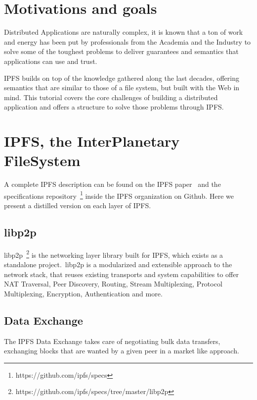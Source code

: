 \documentclass[runningheads,a4paper]{llncs}
\begin{document}

\section{Motivations and goals}\label{sec:motivation}

Distributed Applications are naturally complex, it is known that a ton of work and energy has been put by professionals from the Academia and the Industry to solve some of the toughest problems to deliver guarantees and semantics that applications can use and trust.

IPFS builds on top of the knowledge gathered along the last decades, offering semantics that are similar to those of a file system, but built with the Web in mind. This tutorial covers the core challenges of building a distributed application and offers a structure to solve those problems through IPFS\@.


\section{IPFS, the InterPlanetary FileSystem}\label{sec:ipfs}

A complete IPFS description can be found on the IPFS paper~\cite{IPFS} and the specifications repository~\footnote{https://github.com/ipfs/specs} inside the IPFS organization on Github. Here we present a distilled version on each layer of IPFS\@.

\subsection{libp2p}

libp2p~\footnote{https://github.com/ipfs/specs/tree/master/libp2p} is the networking layer library built for IPFS, which exists as a standalone project.\ libp2p is a modularized and extensible approach to the network stack, that reuses existing transports and system capabilities to offer NAT Traversal, Peer Discovery, Routing, Stream Multiplexing, Protocol Multiplexing, Encryption, Authentication and more.

\subsection{Data Exchange}

The IPFS Data Exchange takes care of negotiating bulk data transfers, exchanging blocks that are wanted by a given peer in a market like approach.
\end{document}
